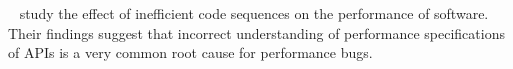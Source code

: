 ~\cite{Jin:2012:UDR:2254064.2254075} study the effect of inefficient code sequences on the performance of software.
Their findings suggest that incorrect understanding of performance specifications of APIs is a very common root cause for
performance bugs. 


